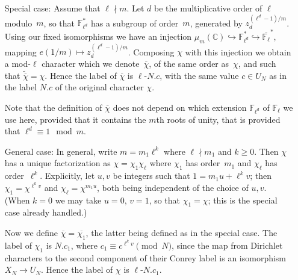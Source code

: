 \documentclass[a4paper, 10pt]{amsart}
\def\C{{\mathbb C}}
\def\Fl{{\mathbb F}_{\ell}}
\def\Fld{{\mathbb F}_{\ell^d}}
\def\Flbar{\overline{{\mathbb F}_{\ell}}}
\newcommand{\CLab}[2]{$#1.#2$}
\newcommand{\DLab}[3]{$#1$-$#2.#3$}
\begin{document}
\begin{itemize}
  \item[Special case:] Assume that $\ell\nmid m$. Let $d$ be the
    multiplicative order of $\ell$ modulo~$m$, so that $\Fld^*$ has a
    subgroup of order~$m$, generated by $z_d^{(\ell^d-1)/m}$.  Using
    our fixed isomorphisms we have an injection
    $\mu_m(\C)\hookrightarrow\Fld^*\hookrightarrow\Flbar^*$, mapping
    $e(1/m)\mapsto z_d^{(\ell^d-1)/m}$.  Composing $\chi$ with this
    injection we obtain a mod-$\ell$ character which we
    denote~$\overline{\chi}$, of the same order as~$\chi$, and such
    that $\tilde{\overline{\chi}}=\chi$.  Hence the label of
    $\overline{\chi}$ is \DLab{\ell}{N}{c}, with the same value
    $c\in U_N$ as in the label \CLab{N}{c} of the original character
    $\chi$.

    Note that the definition of $\overline{\chi}$ does not depend on
    which extension $\Fld$ of $\Fl$ we use here, provided that it
    contains the $m$th roots of unity, that is provided that
    $\ell^d\equiv1\mod{m}$.

    \item[General case:] In general, write $m=m_1\ell^k$ where
      $\ell\nmid m_1$ and $k\ge0$.  Then $\chi$ has a unique
      factorization as $\chi=\chi_1\chi_{\ell}$ where $\chi_1$ has
      order~$m_1$ and $\chi_{\ell}$ has order~$\ell^k$.  Explicitly,
      let $u,v$ be integers such that $1=m_1u+\ell^kv$; then
      $\chi_1=\chi^{\ell^kv}$ and $\chi_{\ell}=\chi^{m_1u}$, both
      being independent of the choice of $u,v$.  (When $k=0$ we may
      take $u=0$, $v=1$, so that $\chi_1=\chi$; this is the special
      case already handled.)

      Now we define $\overline{\chi}=\overline{\chi_1}$, the latter
      being defined as in the special case.  The label of $\chi_1$ is
      \CLab{N}{c_1}, where $c_1\equiv c^{\ell^kv}\pmod{N}$, since the
      map from Dirichlet characters to the second component of their
      Conrey label is an isomorphism $X_N\to U_N$.  Hence the label
      of $\chi$ is \DLab{\ell}{N}{c_1}.
\end{itemize}
\end{document}
